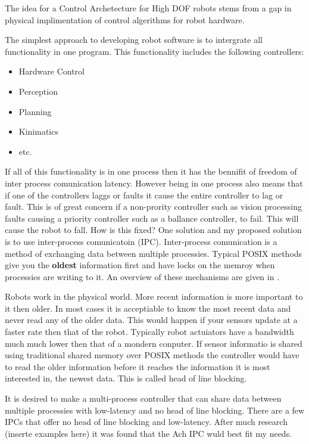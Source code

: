 


The idea for a Control Archetecture for High DOF robots stems from a gap in physical implimentation of control algerithms for robot hardware.

The simplest approach to developing robot software is to intergrate all functionality in one program.  
This functionality includes the following controllers:
\begin{itemize}
\item Hardware Control
\item Perception
\item Planning
\item Kinimatics
\item etc.
\end{itemize}

If all of this functionality is in one process then it has the bennifit of freedom of inter process comunication latency.
However being in one process also means that if one of the controllers laggs or faults it cause the entire controller to lag or fault.
This is of great concern if a non-prority controller such as vision processing faults causing a priority controller such as a ballance controller, to fail.
This will cause the robot to fall.
How is this fixed?
One solution and my proposed solution is to use inter-process comunicatoin (IPC).
Inter-process comunication is a method of exchanging data between multiple processies.
Typical POSIX methods give you the \textbf{oldest} information first and have locks on the memroy when processies are writing to it.
An overview of these mechanisms are given in \cite{stevens2005advanced}.

Robots work in the physical world. 
More recent information is more important to it then older.
In most cases it is acceptiable to know the most recent data and never read any of the older data.
This would happen if your sensors update at a faster rate then that of the robot.
Typically robot actuiators have a bandwidth much much lower then that of a mondern conputer.
If sensor informatio is shared using traditional shared memory over POSIX methods the controller would have to read the older information before it reaches the information it is most interested in, the newest data.
This is called head of line blocking\cite{ach}.

It is desired to make a multi-process controller that can share data between multiple processies with low-latency and no head of line blocking.
There are a few IPCs that offer no head of line blocking and low-latency.  
After much research (inserte examples here) it was found that the Ach IPC wuld best fit my needs.


